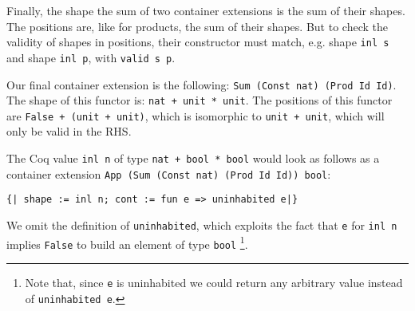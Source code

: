 \documentclass[a4paper, UKenglish, cleveref, autoref, thm-restate]{lipics-v2021}
\begin{document}
Finally, the shape the sum of two container extensions is the sum of their
shapes. The positions are, like for products, the sum of their shapes. But to
check the validity of shapes in positions, their constructor must match, e.g.
shape \texttt{inl s} and shape \texttt{inl p}, with
\texttt{valid s p}. 

Our final container extension is the following: 
\texttt{Sum (Const nat) (Prod Id Id)}.
The shape of this functor is: 
\texttt{nat + unit * unit}. The positions of this functor
are \texttt{False + (unit + unit)}, which is isomorphic
to \texttt{unit + unit}, which will only be valid in the RHS.

The Coq value \texttt{inl n} of type
\texttt{nat + bool * bool} would look as follows as a container
extension 
\texttt{App (Sum (Const nat) (Prod Id Id)) bool}:
\begin{verbatim}
{| shape := inl n; cont := fun e => uninhabited e|}
\end{verbatim}
We omit the definition of \texttt{uninhabited}, which exploits the
fact that \texttt{e} for \texttt{inl n} implies
\texttt{False} to build an element of type \texttt{bool}%
\footnote{Note that, since \texttt{e} is uninhabited we could return
any arbitrary value instead of \texttt{uninhabited e}.}.
\end{document}

